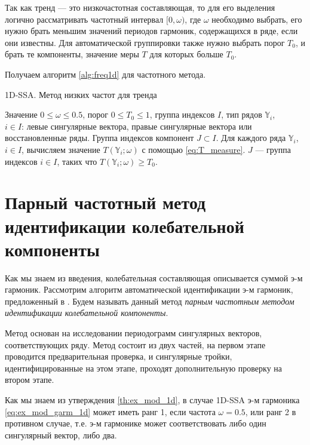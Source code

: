 \documentclass[specialist,
               substylefile = spbu.rtx,
               subf,href,colorlinks=true, 12pt]{disser}
\begin{document}
Так как тренд --- это низкочастотная составляющая, то для его выделения логично рассматривать частотный интервал $[0, \omega)$, где $\omega$ необходимо выбрать, его нужно брать меньшим значений периодов гармоник, содержащихся в ряде, если они известны.
Для автоматической группировки также нужно выбрать порог $T_0$, и брать те компоненты, значение меры $T$ для которых больше $T_0$.

Получаем алгоритм \ref{alg:freq1d} для частотного метода.

\begin{algorithm}[!hhh]
\caption{1D-SSA. Метод низких частот для тренда}
\label{alg:freq1d}
\begin{algorithmic}[1]
\REQUIRE Значение  $0 \leqslant  \omega \leqslant 0.5$, порог $0 \leqslant T_0 \leqslant 1$, группа индексов $I$, тип рядов $\mathbb{Y}_i$,\\ $i \in I$: левые сингулярные вектора,
правые сингулярные вектора или восстановленные ряды.
\ENSURE Группа индексов компонент $J \subset I$.
\STATE  Для каждого ряда $\mathbb{Y}_i$, $i \in I$, вычисляем значение $T(\mathbb{Y}_i; \omega)$ с помощью \eqref{eq:T_measure}.
\STATE $J$ --- группа индексов $i \in I$, таких что $T(\mathbb{Y}_i; \omega) \geqslant T_0$.
\end{algorithmic}
\end{algorithm}

\section{Парный частотный метод идентификации колебательной компоненты}
\label{sec:1d_pgram_method}

Как мы знаем из введения, колебательная составляющая описывается суммой э-м гармоник.
Рассмотрим алгоритм автоматической идентификации э-м гармоник, предложенный в \cite{Alexandrov2006}.
 Будем называть данный метод \textit{парным частотным методом идентификации колебательной компоненты}.

Метод основан на исследовании периодограмм сингулярных векторов, соответствующих ряду. Метод состоит из двух частей, на первом этапе проводится предварительная проверка, и сингулярные тройки, идентифицированные на этом этапе, проходят дополнительную проверку на втором этапе.

Как мы знаем из утверждения \ref{th:ex_mod_1d}, в случае 1D-SSA э-м гармоника \eqref{eq:ex_mod_garm_1d} может иметь ранг 1, если частота $\omega=0.5$, или ранг 2 в противном случае, т.е. э-м гармонике может соответствовать либо один сингулярный вектор, либо два.
\end{document}
